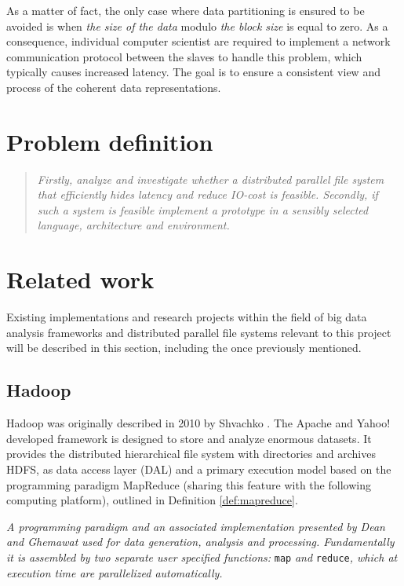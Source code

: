 As a matter of fact, the only case where data partitioning is ensured to be avoided is when \textit{the size of the data} modulo \textit{the block size} is equal to zero. As a consequence, individual computer scientist are required to implement a network communication protocol between the slaves to handle this problem, which typically causes increased latency. The goal is to ensure a consistent view and process of the coherent data representations.

\section{Problem definition} \label{sec:problem}
\begin{quotation}
\hspace*{-7mm}
\textit{Firstly, analyze and investigate whether a distributed parallel file system that efficiently hides latency and reduce IO-cost is feasible. Secondly, if such a system is feasible implement a prototype in a sensibly selected language, architecture and environment.} \newline
\end{quotation}

\section{Related work} \label{sec:related}
Existing implementations and research projects within the field of big data analysis frameworks and distributed parallel file systems relevant to this project will be described in this section, including the once previously mentioned.

\subsection*{Hadoop}
Hadoop was originally described in 2010 by Shvachko \etal \cite{Shvachko:2010:HDF:1913798.1914427}. The Apache and Yahoo! developed framework is designed to store and analyze enormous datasets. It provides the distributed hierarchical file system with directories and archives HDFS, as data access layer (DAL) and a primary execution model based on the programming paradigm MapReduce (sharing this feature with the following computing platform), outlined in Definition \ref{def:mapreduce}.
\vspace*{2mm}

\begin{definition}[MapReduce] \label{def:mapreduce}
\textit{A programming paradigm and an associated implementation presented by Dean and Ghemawat} \cite{Dean:2008:MSD:1327452.1327492} \textit{used for data generation, analysis and processing. Fundamentally it is assembled by two separate user specified functions:} \texttt{map} \textit{and} \texttt{reduce}\textit{, which at execution time are parallelized automatically.}
\end{definition}
\vspace*{2mm}

